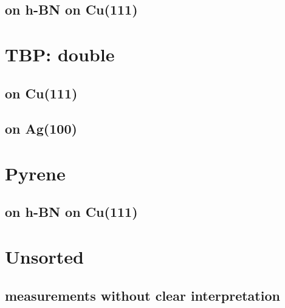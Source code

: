 \documentclass[10pt,a4paper,twoside
,BCOR=8mm				%
]{scrbook}
\begin{document}
   \section{on h-BN on Cu(111)}
      
\printbibliography
\chapter{TBP: double}
   \section{on Cu(111)}
      
   \section{on Ag(100)}
      
\printbibliography
\chapter{Pyrene}
   \section{on h-BN on Cu(111)}
      
\printbibliography
\chapter{Unsorted}
   \section{measurements without clear interpretation}
      
\printbibliography  
\printindex
\backmatter{}
\end{document}
